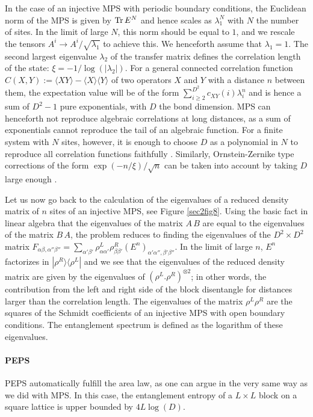 \documentclass[rmp,aps,reprint,superscriptaddress,nobalancelastpage]{revtex4-1}
\begin{document}
In the case of an injective MPS with periodic boundary conditions, the Euclidean norm of the MPS is given by ${\rm Tr}\,E^N$ and hence scales as $\lambda_1^N$ with $N$ the number of sites. In the limit of large $N$, this norm should be equal to $1$, and we  rescale the tensors $A^i\rightarrow A^i/\sqrt{\lambda_1}$ to achieve this. We henceforth assume that $\lambda_1=1$. The second largest eigenvalue $\lambda_2$ of the transfer matrix defines the correlation length of the state: $\xi=-1/\log(|\lambda_2|)$. For a general connected correlation function
$C(X,Y):=\langle XY\rangle-\langle X\rangle \langle Y\rangle$
of two operators $X$ and $Y$
with a distance $n$ between them,
the expectation value will be of the form $\sum_{i\geq 2}^{D^2} c_{XY}(i)\lambda_i^n$ and is hence a sum of $D^2-1$ pure exponentials, with $D$ the bond dimension. MPS can henceforth not reproduce algebraic correlations at long distances, as a sum of exponentials cannot reproduce the tail of an algebraic function. For a finite system with $N$ sites, however, it is  enough to choose $D$ as a polynomial in $N$ to reproduce all correlation functions faithfully \cite{verstraete:faithfully}. Similarly, Ornstein-Zernike type corrections of the form $\exp(-n/\xi)/\sqrt{n}$ can be taken into account by taking $D$ large enough \cite{zauner:tm-dispersion,rams2015truncating}.

Let us now go back to the calculation of the eigenvalues of a reduced density matrix of $n$ sites of an injective MPS, see Figure \ref{sec2fig8}. Using the basic fact in linear algebra that the eigenvalues of the matrix $A\,B$ are equal to the eigenvalues of the matrix $B\,A$, the problem reduces to finding the eigenvalues of the $D^2\times D^2$ matrix $F_{\alpha\beta,\alpha''\beta''}=\sum_{\alpha'\beta'}\rho^L_{\alpha\alpha'}\rho^R_{\beta\beta'}\left(E^n\right)_{\alpha'\alpha'',\beta'\beta''}$. In the limit of large $n$, $E^n$ factorizes in $|\rho^R\rangle\langle\rho^L|$ and we see that the eigenvalues of the reduced density matrix are given by the eigenvalues of $\left(\rho^L.\rho^R\right)^{\otimes 2}$; in other words, the contribution from the left and right side of the block disentangle for distances larger than the correlation length. The eigenvalues of the matrix $\rho^L\rho^R$ are the squares of the Schmidt coefficients of an injective MPS with open boundary conditions. The entanglement spectrum is defined as the logarithm of these eigenvalues.

\paragraph{PEPS}
PEPS automatically fulfill the area law, as one can argue in the very same way as we did with MPS. In this case, the entanglement entropy of a $L\times L$ block on a square lattice is upper bounded by $4L\log(D)$.
\end{document}
